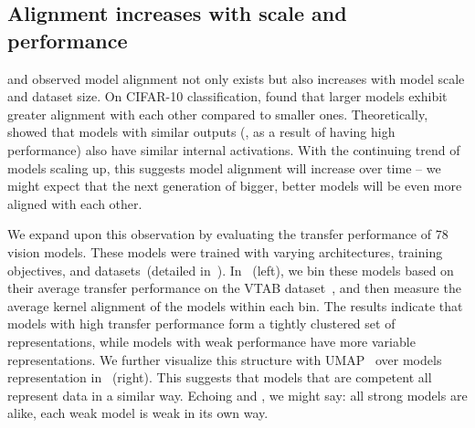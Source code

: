 \documentclass{article}
\newcommand{\phil}[1]{{\color{orange}PI: #1}}
\theoremstyle{plain}
\theoremstyle{definition}
\theoremstyle{remark}
\begin{document}
\subsection{Alignment increases with scale and performance}

\citet{kornblith2019similarity} and \citet{roeder2021linear} observed model alignment not only exists but also increases with model scale and dataset size. On CIFAR-10 classification, \citet{krizhevsky2009learning} found that larger models exhibit greater alignment with each other compared to smaller ones. 
Theoretically, \citet{balestriero2018spline} showed that models with similar outputs (\eg, as a result of having high performance) also have similar internal activations. 
With the continuing trend of models scaling up, this suggests model alignment will increase over time -- we might expect that the next generation of bigger, better models will be even more aligned with each other.%
%

We expand upon this observation by evaluating the transfer performance of $78$ vision models. These models were trained with varying architectures, training objectives, and datasets~(detailed in~). In~ (left), we bin these models based on their average transfer performance on the VTAB dataset~\cite{zhai2019vtab}, and then measure the average kernel alignment of the models within each bin. %
The results indicate that models with high transfer performance form a tightly clustered set of representations, while models with weak performance have more variable representations. We further visualize this structure with UMAP~\citep{mcinnes2018umap} over models representation in~ (right). This suggests that models that are competent all represent data in a similar way. Echoing \citet{bansal2021revisiting} and \citet{tolstoy1877anna}, we might say: all strong models are alike, each weak model is weak in its own way. 

\end{document}
